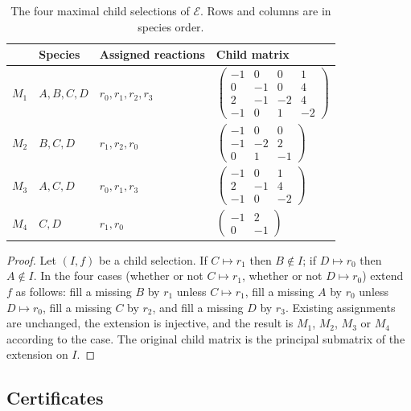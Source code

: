 \documentclass[11pt,a4paper]{article}
\theoremstyle{plain}
\theoremstyle{definition}
\theoremstyle{remark}
\begin{document}
\begin{table}[ht]
\centering
\begin{tabular}{@{}clll@{}}
\toprule
& Species & Assigned reactions & Child matrix\\
\midrule
$M_1$ & $A,B,C,D$ & $r_0,r_1,r_2,r_3$ &
$\begin{pmatrix}-1&0&0&1\\0&-1&0&4\\2&-1&-2&4\\-1&0&1&-2\end{pmatrix}$\\[14pt]
$M_2$ & $B,C,D$ & $r_1,r_2,r_0$ &
$\begin{pmatrix}-1&0&0\\-1&-2&2\\0&1&-1\end{pmatrix}$\\[10pt]
$M_3$ & $A,C,D$ & $r_0,r_1,r_3$ &
$\begin{pmatrix}-1&0&1\\2&-1&4\\-1&0&-2\end{pmatrix}$\\[10pt]
$M_4$ & $C,D$ & $r_1,r_0$ &
$\begin{pmatrix}-1&2\\0&-1\end{pmatrix}$\\
\bottomrule
\end{tabular}
\caption{The four maximal child selections of $\mathcal E$. Rows and columns are in species order.}
\label{tab:maximal}
\end{table}

\begin{proof}
Let $(I,f)$ be a child selection. If $C\mapsto r_1$ then $B\notin I$; if $D\mapsto r_0$ then $A\notin I$. In the four cases (whether or not $C\mapsto r_1$, whether or not $D\mapsto r_0$) extend $f$ as follows: fill a missing $B$ by $r_1$ unless $C\mapsto r_1$, fill a missing $A$ by $r_0$ unless $D\mapsto r_0$, fill a missing $C$ by $r_2$, and fill a missing $D$ by $r_3$. Existing assignments are unchanged, the extension is injective, and the result is $M_1$, $M_2$, $M_3$ or $M_4$ according to the case. The original child matrix is the principal submatrix of the extension on $I$.
\end{proof}

\subsection{Certificates}
\end{document}
